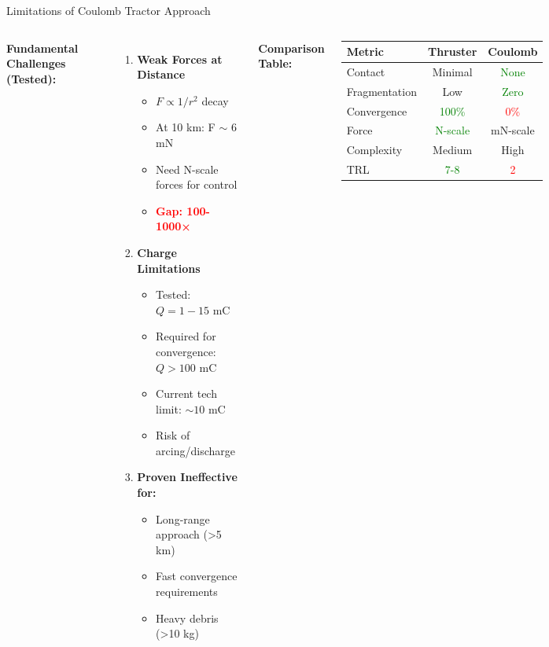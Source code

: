 \documentclass[aspectratio=169]{beamer}
\begin{document}
\begin{frame}{Limitations of Coulomb Tractor Approach}
\begin{columns}
\textbf{Fundamental Challenges (Tested):}
\begin{enumerate}
    \item \textbf{Weak Forces at Distance}
    \begin{itemize}
        \item $F \propto 1/r^2$ decay
        \item At 10 km: F $\sim$ 6 mN
        \item Need N-scale forces for control
        \item \textcolor{red}{\textbf{Gap: 100-1000×}}
    \end{itemize}

    \item \textbf{Charge Limitations}
    \begin{itemize}
        \item Tested: $Q = 1-15$ mC
        \item Required for convergence: $Q > 100$ mC
        \item Current tech limit: $\sim 10$ mC
        \item Risk of arcing/discharge
    \end{itemize}

    \item \textbf{Proven Ineffective for:}
    \begin{itemize}
        \item Long-range approach (>5 km)
        \item Fast convergence requirements
        \item Heavy debris (>10 kg)
    \end{itemize}
\end{enumerate}

\textbf{Comparison Table:}
\begin{table}
\centering
\small
\begin{tabular}{lcc}
\toprule
\textbf{Metric} & \textbf{Thruster} & \textbf{Coulomb} \\
\midrule
Contact & Minimal & \textcolor{green}{None} \\
Fragmentation & Low & \textcolor{green}{Zero} \\
Convergence & \textcolor{green}{100\%} & \textcolor{red}{0\%} \\
Force & \textcolor{green}{N-scale} & mN-scale \\
Complexity & Medium & High \\
TRL & \textcolor{green}{7-8} & \textcolor{red}{2} \\
\bottomrule
\end{tabular}
\end{table}


\end{columns}
\end{frame}
\end{document}
